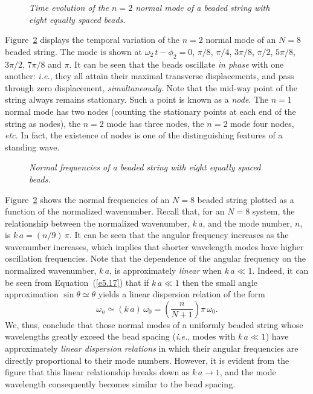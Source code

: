 \begin{figure}
\epsfysize=3in
\centerline{}
\caption{\em Time evolution of the $n=2$ normal mode of a beaded string with eight equally spaced
beads.}\label{f5.4}   
\end{figure}

Figure~\ref{f5.5}  displays the temporal variation of the $n=2$ normal mode of
an $N=8$  beaded string. The mode is shown at $\omega_2\,t-\phi_2=0$, $\pi/8$, $\pi/4$, $3\pi/8$, $\pi/2$, $5\pi/8$, $3\pi/2$, $7\pi/8$ and $\pi$. It can be seen
that the beads oscillate {\em in phase}\/ with one another: {\em i.e.}, they all attain their maximal
transverse displacements, and pass through zero displacement, {\em simultaneously}. 
Note that the mid-way point of the string always remains stationary. Such a point is
known as a {\em node}. The $n=1$ normal mode has two nodes (counting the
stationary points at each end of the string as nodes), the $n=2$
mode has three nodes, the $n=2$ mode four nodes, {\em etc.} In fact, the existence
of nodes is one of the distinguishing features of a standing wave.

\begin{figure}
\epsfysize=3in
\centerline{}
\caption{\em Normal frequencies of a beaded
string with eight equally spaced beads.}\label{f5.5}   
\end{figure}

Figure~\ref{f5.5} shows the normal frequencies  of an $N=8$
beaded string  plotted  as a function of the normalized wavenumber. Recall that, for an $N=8$
system,
the relationship between the normalized wavenumber, $k\,a$, and the
mode number, $n$, is $k\,a =  (n/9)\,\pi$.
It can be seen that the angular frequency  increases as the  wavenumber
 increases, which implies that shorter wavelength  modes  have
higher oscillation frequencies. Note that the dependence of the angular frequency
on the normalized wave\-number, $k\,a$, is approximately {\em linear}\/ when $k\,a\ll 1$. Indeed, it can be seen from  Equation~(\ref{e5.17}) that if $k\,a\ll 1$ then the small
angle approximation $\sin\theta\simeq \theta$ yields a linear dispersion relation
of the form
\begin{equation}\label{e5.22}
\omega_n \simeq (k\,a)\,\omega_0 = \left(\frac{n}{N+1}\right)\pi\,\omega_0.
\end{equation}
We, thus, conclude that those normal modes of a uniformly beaded string whose wavelengths greatly
exceed the bead spacing ({\em i.e.}, modes with $k\,a\ll 1$) have approximately {\em linear dispersion
relations}\/ in which their angular frequencies are directly proportional
to their mode numbers. However, it is evident from the figure that this linear relationship
breaks down as $k\,a\rightarrow 1$, and the mode wavelength consequently becomes
similar to the bead spacing. 

